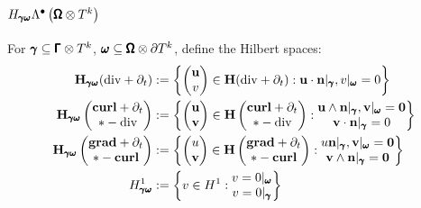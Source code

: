         \subsection*{$H_{\pmb{\mathsf{\gamma}}\pmb{\mathsf{\omega}}}\Lambda^{\bullet}\left(\pmb{\mathsf{\Omega}}\otimes T^{k}\right)$}
            For $\pmb{\mathsf{\gamma}}  \subseteq  \pmb{\mathsf{\Gamma}}\otimes T^{k}$, $\pmb{\mathsf{\omega}}  \subseteq  \pmb{\mathsf{\Omega}}\otimes\partial T^{k}$, define the Hilbert spaces:
            \begin{align}
                \mathbf{H}_{\pmb{\mathsf{\gamma}}\pmb{\mathsf{\omega}}}(\mathrm{div} + \partial_{t})  &:=  \left\{\begin{pmatrix} \mathbf{u} \\ v \end{pmatrix} \in \mathbf{H}(\mathrm{div} + \partial_{t}) : \mathbf{u}\cdot\mathbf{n}|_{\pmb{\mathsf{\gamma}}}, v|_{\pmb{\mathsf{\omega}}} = 0\right\}  \\
                \mathbf{H}_{\pmb{\mathsf{\gamma}}\pmb{\mathsf{\omega}}}\left(\begin{matrix} \mathbf{curl} + \partial_{t} \\ * - \mathrm{div} \end{matrix}\right)  &:=  \left\{\begin{pmatrix} \mathbf{u} \\ \mathbf{v} \end{pmatrix} \in \mathbf{H}\left(\begin{matrix} \mathbf{curl} + \partial_{t} \\ * - \mathrm{div} \end{matrix}\right) : \begin{matrix} \mathbf{u}\wedge\mathbf{n}|_{\pmb{\mathsf{\gamma}}}, \mathbf{v}|_{\pmb{\mathsf{\omega}}} = \mathbf{0} \\ \mathbf{v}\cdot\mathbf{n}|_{\pmb{\mathsf{\gamma}}} = 0 \end{matrix}\right\}  \\
                \mathbf{H}_{\pmb{\mathsf{\gamma}}\pmb{\mathsf{\omega}}}\left(\begin{matrix} \mathbf{grad} + \partial_{t} \\ * - \mathbf{curl} \end{matrix}\right)  &:=  \left\{\begin{pmatrix} u \\ \mathbf{v} \end{pmatrix} \in \mathbf{H}\left(\begin{matrix} \mathbf{grad} + \partial_{t} \\ * - \mathbf{curl} \end{matrix}\right) : \begin{matrix} u\mathbf{n}|_{\pmb{\mathsf{\gamma}}}, \mathbf{v}|_{\pmb{\mathsf{\omega}}} = \mathbf{0} \\ \mathbf{v}\wedge\mathbf{n}|_{\pmb{\mathsf{\gamma}}} = \mathbf{0} \end{matrix}\right\}  \\
                H^{1}_{\pmb{\mathsf{\gamma}}\pmb{\mathsf{\omega}}}  &:=  \left\{v \in H^{1} : \begin{matrix} v = 0|_{\pmb{\mathsf{\omega}}} \\ v = 0|_{\pmb{\mathsf{\gamma}}} \end{matrix}\right\}
            \end{align}
